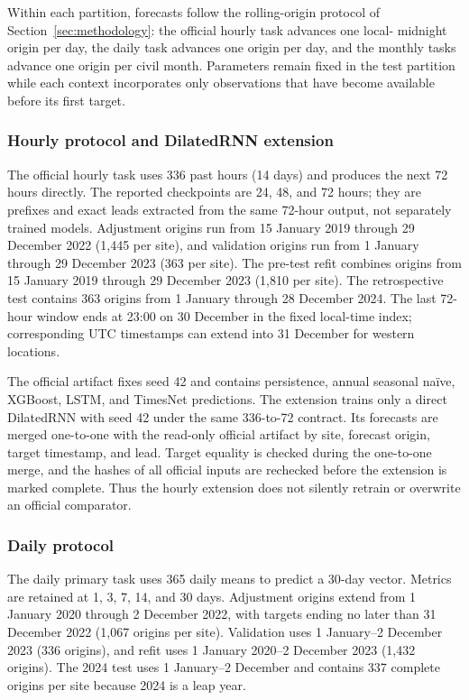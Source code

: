 Within each partition, forecasts follow the rolling-origin protocol of
Section~\ref{sec:methodology}: the official hourly task advances one local-
midnight origin per day, the daily task advances one origin per day, and the
monthly tasks advance one origin per civil month. Parameters remain fixed in
the test partition while each context incorporates only observations that have
become available before its first target.

\subsubsection{Hourly protocol and DilatedRNN extension}

The official hourly task uses 336 past hours (14 days) and produces the next
72 hours directly. The reported checkpoints are 24, 48, and 72 hours; they are
prefixes and exact leads extracted from the same 72-hour output, not separately
trained models. Adjustment origins run from 15 January 2019 through
29 December 2022 (1,445 per site), and validation origins run from
1 January through 29 December 2023 (363 per site). The pre-test refit combines
origins from 15 January 2019 through 29 December 2023 (1,810 per site). The
retrospective test contains 363 origins from 1 January through
28 December 2024. The last 72-hour window ends at 23:00 on 30 December in the
fixed local-time index; corresponding UTC timestamps can extend into
31 December for western locations.

The official artifact fixes seed 42 and contains persistence, annual seasonal
na\"ive, XGBoost, LSTM, and TimesNet predictions. The extension trains only a
direct DilatedRNN with seed 42 under the same 336-to-72 contract. Its forecasts
are merged one-to-one with the read-only official artifact by site, forecast
origin, target timestamp, and lead. Target equality is checked during the
one-to-one merge, and the hashes of all official inputs are rechecked before
the extension is marked complete. Thus the hourly extension does not silently
retrain or overwrite an official comparator.

\subsubsection{Daily protocol}

The daily primary task uses 365 daily means to predict a 30-day vector. Metrics
are retained at 1, 3, 7, 14, and 30 days. Adjustment origins extend from
1 January 2020 through 2 December 2022, with targets ending no later than
31 December 2022 (1,067 origins per site). Validation uses
1 January--2 December 2023 (336 origins), and refit uses
1 January 2020--2 December 2023 (1,432 origins). The 2024 test uses
1 January--2 December and contains 337 complete origins per site because 2024
is a leap year.

